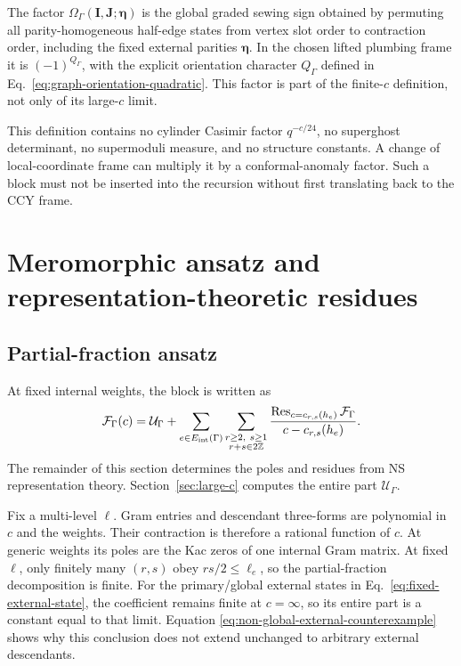 \documentclass[11pt]{article}
\newcommand{\F}{\mathcal F}
\newcommand{\U}{\mathcal U}
\DeclareMathOperator{\Res}{Res}
\begin{document}
The factor \(\Omega_\Gamma(\bm I,\bm J;\bm\eta)\) is the global graded sewing
sign obtained by permuting all parity-homogeneous half-edge states from vertex
slot order to contraction order, including the fixed external parities
\(\bm\eta\).  In the chosen lifted plumbing frame it is
\((-1)^{Q_\Gamma}\), with the explicit orientation character
\(Q_\Gamma\) defined in Eq.~\eqref{eq:graph-orientation-quadratic}.  This
factor is part of the finite-\(c\) definition, not only of its large-\(c\)
limit.

This definition contains no cylinder Casimir factor \(q^{-c/24}\), no
superghost determinant, no supermoduli measure, and no structure constants.
A change of local-coordinate frame can multiply it by a conformal-anomaly
factor.  Such a block must not be inserted into the recursion without first
translating back to the CCY frame.

\section{Meromorphic ansatz and representation-theoretic residues}
\label{sec:meromorphic-ansatz}

\subsection{Partial-fraction ansatz}

At fixed internal weights, the block is written as
\begin{equation}
 \F_\Gamma(c)=\U_\Gamma
 +\sum_{e\in E_{\rm int}(\Gamma)}
  \sum_{\substack{r\ge2,\ s\ge1\\r+s\in2\mathbb Z}}
  \frac{\Res_{c=c_{r,s}(h_e)}\F_\Gamma}
       {c-c_{r,s}(h_e)}.
 \label{eq:partial-fraction-ansatz}
\end{equation}
The remainder of this section determines the poles and residues from NS
representation theory.  Section~\ref{sec:large-c} computes the entire part
\(\U_\Gamma\).

Fix a multi-level \(\bm\ell\).  Gram entries and descendant three-forms are
polynomial in \(c\) and the weights.  Their contraction is therefore a
rational function of \(c\).  At generic weights its poles are the Kac zeros
of one internal Gram matrix.  At fixed \(\bm\ell\), only finitely many
\((r,s)\) obey \(rs/2\le\ell_e\), so the partial-fraction decomposition is
finite.  For the primary/global external states in
Eq.~\eqref{eq:fixed-external-state}, the coefficient remains finite at
\(c=\infty\), so its entire part is a constant equal to that limit.  Equation
\eqref{eq:non-global-external-counterexample} shows why this conclusion does
not extend unchanged to arbitrary external descendants.
\end{document}
